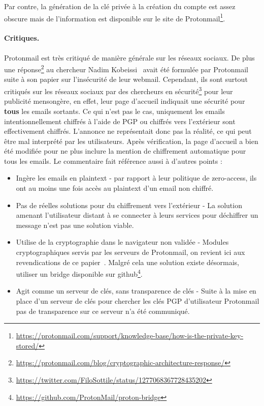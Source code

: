 Par contre, la génération de la clé privée à la création du compte est assez obscure mais de l'information est disponible sur le site de Protonmail\footnote{\url{https://protonmail.com/support/knowledge-base/how-is-the-private-key-stored/}}.

\paragraph*{Critiques.}
Protonmail est très critiqué de manière générale sur les réseaux sociaux. De plus une réponse\footnote{\url{https://protonmail.com/blog/cryptographic-architecture-response/}} au chercheur Nadim Kobeissi~\cite{journals/iacr/Kobeissi18a} avait été formulée par Protonmail suite à son papier sur l'insécurité de leur webmail. Cependant, ils sont surtout critiqués sur les réseaux sociaux par des chercheurs en sécurité\footnote{\url{https://twitter.com/FiloSottile/status/1277068367728435202}} pour leur publicité mensongère, en effet, leur page d'accueil indiquait une sécurité pour \textbf{tous} les emails sortants. Ce qui n'est pas le cas, uniquement les emails intentionnellement chiffrés à l'aide de PGP ou chiffrés vers l'extérieur sont effectivement chiffrés. L'annonce ne représentait donc pas la réalité, ce qui peut être mal interprété par les utilisateurs. Après vérification, la page d'accueil a bien été modifiée pour ne plus inclure la mention de chiffrement automatique pour tous les emails. Le commentaire fait référence aussi à d'autres points :
\begin{itemize}
	\item Ingère les emails en plaintext - par rapport à leur politique de zero-access, ils ont au moins une fois accès au plaintext d'un email non chiffré.
	\item Pas de réelles solutions pour du chiffrement vers l'extérieur - La solution amenant l'utilisateur distant à se connecter à leurs services pour déchiffrer un message n'est pas une solution viable.
	\item Utilise de la cryptographie dans le navigateur non validée - Modules cryptographiques servis par les serveurs de Protonmail, on revient ici aux revendications de ce papier~\cite{journals/iacr/Kobeissi18a}. Malgré cela une solution existe désormais, utiliser un bridge disponible sur github\footnote{\url{https://github.com/ProtonMail/proton-bridge}}.
	\item Agit comme un serveur de clés, sans transparence de clés - Suite à la mise en place d'un serveur de clés pour chercher les clés PGP d'utilisateur Protonmail pas de transparence sur ce serveur n'a été communiqué.
\end{itemize}
